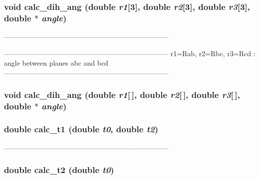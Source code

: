 \subsubsection{\setlength{\rightskip}{0pt plus 5cm}void calc\_\-dih\_\-ang (double {\em r1}[3], double {\em r2}[3], double {\em r3}[3], double $\ast$ {\em angle})}\label{PTripepClosure_8h_d643a1e676ed9d0a8ece4510764a42ce}


----------------------------------------------------------------------- 



----------------------------------------------------------------------- r1=Rab, r2=Rbc, r3=Rcd : angle between planes abc and bcd ----------------------------------------------------------------------- 
\subsubsection{\setlength{\rightskip}{0pt plus 5cm}void calc\_\-dih\_\-ang (double {\em r1}[$\,$], double {\em r2}[$\,$], double {\em r3}[$\,$], double $\ast$ {\em angle})}\label{PTripepClosure_8h_e080deae6221439aa79d9a64266dab63}


\subsubsection{\setlength{\rightskip}{0pt plus 5cm}double calc\_\-t1 (double {\em t0}, double {\em t2})}\label{PTripepClosure_8h_97edf0a2ece832b26e737203711dad8b}


----------------------------------------------------------------------- 

\subsubsection{\setlength{\rightskip}{0pt plus 5cm}double calc\_\-t2 (double {\em t0})}\label{PTripepClosure_8h_5d51d54f1f64b63f2edc36ed996eaee8}


